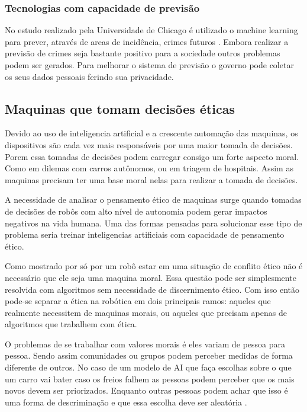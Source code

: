 \subsubsection{Tecnologias com capacidade de previsão}

No estudo realizado pela Universidade de Chicago é utilizado o machine learning para prever, através de areas de incidência, crimes futuros \cite{rotaru2021precise}. Embora realizar a previsão de crimes seja bastante positivo para a sociedade outros problemas podem ser gerados. Para melhorar o sistema de previsão o governo pode coletar os seus dados pessoais ferindo sua privacidade.


\subsection{Maquinas que tomam decisões éticas}

Devido ao uso de inteligencia artificial e a crescente automação das maquinas, os dispositivos são cada vez mais responsáveis por uma maior tomada de decisões. Porem essa tomadas de decisões podem carregar consigo um forte aspecto moral. Como em dilemas com carros autônomos, ou em triagem de hospitais. Assim as maquinas precisam ter uma base moral nelas para realizar a tomada de decisões.

A necessidade de analisar o pensamento ético de maquinas surge quando tomadas de decisões de robôs com alto nível de autonomia podem gerar impactos negativos na vida humana. Uma das formas pensadas para solucionar esse tipo de problema seria treinar inteligencias artificiais com capacidade de pensamento ético.

Como mostrado por \cite{vanWynsberghe2019719} só por um robô estar em uma situação de conflito ético não é necessário que ele seja uma maquina moral. Essa questão pode ser simplesmente resolvida com algoritmos sem necessidade de discernimento ético. Com isso então pode-se separar a ética na robótica em dois principais ramos: aqueles que realmente necessitem de maquinas morais, ou aqueles que precisam apenas de algoritmos que trabalhem com ética.

O problemas de se trabalhar com valores morais é eles variam de pessoa para pessoa. Sendo assim comunidades ou grupos podem perceber medidas de forma diferente de outros. No caso de um modelo de AI que faça escolhas sobre o que um carro vai bater caso os freios falhem as pessoas podem perceber que os mais novos devem ser priorizados. Enquanto outras pessoas podem achar que isso é uma forma de descriminação e que essa escolha deve ser aleatória \cite{Telkamp2022}.

